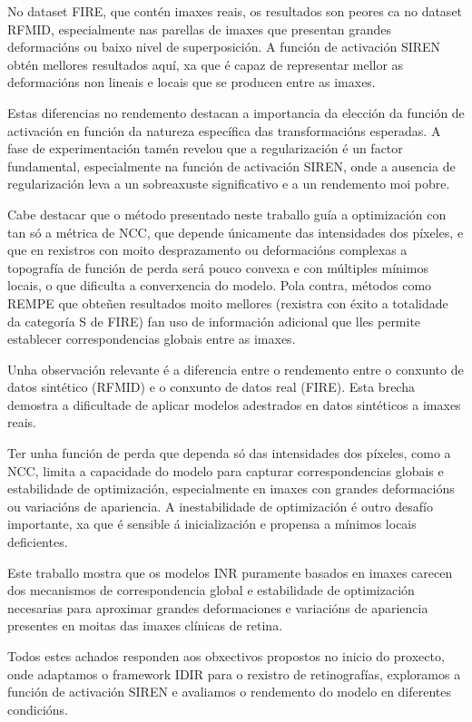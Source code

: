No dataset FIRE, que contén imaxes reais, os resultados son peores ca no dataset RFMID, especialmente nas parellas de imaxes que presentan grandes deformacións ou baixo nivel de superposición.
A función de activación SIREN obtén mellores resultados aquí, xa que é capaz de representar mellor as deformacións non lineais e locais que se producen entre as imaxes.

Estas diferencias no rendemento destacan a importancia da elección da función de activación en función da natureza específica das transformacións esperadas.
A fase de experimentación tamén revelou que a regularización é un factor fundamental, especialmente na función de activación SIREN, onde a ausencia de regularización leva a un sobreaxuste significativo e a un rendemento moi pobre.

Cabe destacar que o método presentado neste traballo guía a optimización con tan só a métrica de NCC, que depende únicamente das intensidades dos píxeles, e que en rexistros con moito desprazamento ou deformacións complexas a topografía de función de perda será pouco convexa e con múltiples mínimos locais, o que dificulta a converxencia do modelo.
Pola contra, métodos como REMPE \cite{rempe} que obteñen resultados moito mellores (rexistra con éxito a totalidade da categoría S de FIRE) fan uso de información adicional que lles permite establecer correspondencias globais entre as imaxes.

Unha observación relevante é a diferencia entre o rendemento entre o conxunto de datos sintético (RFMID) e o conxunto de datos real (FIRE). Esta brecha demostra a dificultade de aplicar modelos adestrados en datos sintéticos a imaxes reais.

Ter unha función de perda que dependa só das intensidades dos píxeles, como a NCC, limita a capacidade do modelo para capturar correspondencias globais e estabilidade de optimización, especialmente en imaxes con grandes deformacións ou variacións de apariencia.
A inestabilidade de optimización é outro desafío importante, xa que é sensible á inicialización e propensa a mínimos locais deficientes.

Este traballo mostra que os modelos \gls{INR} puramente basados en imaxes carecen dos mecanismos de correspondencia global e estabilidade de optimización necesarias para aproximar grandes deformaciones e variacións de apariencia presentes en moitas das imaxes clínicas de retina.

Todos estes achados responden aos obxectivos propostos no inicio do proxecto, onde adaptamos o framework IDIR para o rexistro de retinografías, exploramos a función de activación SIREN e avaliamos o rendemento do modelo en diferentes condicións.

